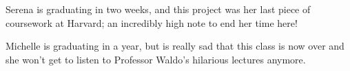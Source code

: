 \documentclass[preprint,review,12pt]{cs262}
\begin{document}
Serena is graduating in two weeks, and this project was her last piece of coursework at Harvard; an incredibly high note to end her time here! 

Michelle is graduating in a year, but is really sad that this class is now over and she won't get to listen to Professor Waldo's hilarious lectures anymore.







% 
% 
% 
% 
% 
% 
% 
% 
% 
% 
% 
% 


\end{document}
